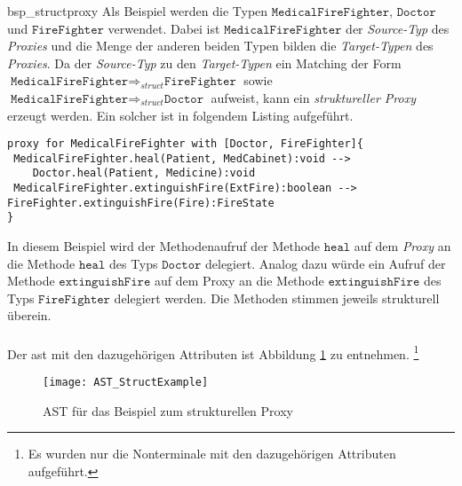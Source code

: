 \begin{example}{bsp_structproxy}
Als Beispiel werden die Typen $\texttt{MedicalFireFighter}$, $\texttt{Doctor}$ und $\texttt{FireFighter}$ verwendet. Dabei ist $\texttt{MedicalFireFighter}$ der \emph{Source-Typ} des \emph{Proxies} und die Menge der anderen beiden Typen bilden die \emph{Target-Typen} des \emph{Proxies}. Da der \emph{Source-Typ }zu den \emph{Target-Typen} ein Matching der Form $\texttt{MedicalFireFighter} \Rightarrow_{struct} \texttt{FireFighter}$ sowie\linebreak $\texttt{MedicalFireFighter} \Rightarrow_{struct} \texttt{Doctor}$ aufweist, kann ein \emph{struktureller Proxy} erzeugt werden. Ein solcher ist in folgendem Listing aufgeführt.
\begin{lstlisting}[style = dsl, caption = Struktureller Proxy für MedicalFireFighter, captionpos = b]
proxy for MedicalFireFighter with [Doctor, FireFighter]{
 MedicalFireFighter.heal(Patient, MedCabinet):void -->
    Doctor.heal(Patient, Medicine):void
 MedicalFireFighter.extinguishFire(ExtFire):boolean --> FireFighter.extinguishFire(Fire):FireState
}
\end{lstlisting}
In diesem Beispiel wird der Methodenaufruf der Methode $\texttt{heal}$ auf dem \emph{Proxy} an die Methode $\texttt{heal}$ des Typs $\texttt{Doctor}$ delegiert. Analog dazu würde ein Aufruf der Methode $\texttt{extinguishFire}$ auf dem Proxy an die Methode $\texttt{extinguishFire}$ des Typs $\texttt{FireFighter}$ delegiert werden. Die Methoden stimmen jeweils strukturell überein.
\\\\
Der \acrshort{ast} mit den dazugehörigen Attributen ist Abbildung \ref{fig:ASTSTRUCT} zu entnehmen. \footnote{Es wurden nur die Nonterminale mit den dazugehörigen Attributen aufgeführt.}

\end{example}
\begin{figure}[h!]
\centering
\texttt{[image: AST\_StructExample]}
\caption{AST für das Beispiel zum strukturellen Proxy}
\label{fig:ASTSTRUCT}
\end{figure}
\noindent
